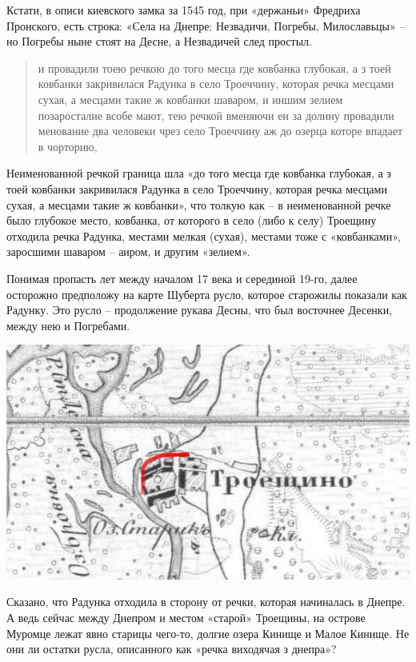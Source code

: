 Кстати, в описи киевского замка за 1545 год, при «держаньи» Фредриха Пронского, есть строка: «Села на Днепре: Незвадичи, Погребы, Милославьцы» – но Погребы ныне стоят на Десне, а Незвадичей след простыл.

\begin{quotation}
и провадили тоею речкою до того месца где ковбанка глубокая, а з тоей ковбанки закривилася Радунка в село Троеччину, которая речка месцами сухая, а месцами такие ж ковбанки шаваром, и иншим зелием позаросталие всобе мают, тею речкой вменяючи еи за долину провадили менование два человеки чрез село Троеччину аж до озерца которе впадает в чорторию, 
\end{quotation}

Неименованной речкой граница шла «до того месца где ковбанка глубокая, а з тоей ковбанки закривилася Радунка в село Троеччину, которая речка месцами сухая, а месцами такие ж ковбанки», что толкую как – в неименованной речке было глубокое место, ковбанка, от которого в село (либо к селу) Троещину отходила речка Радунка, местами мелкая (сухая), местами тоже с «ковбанками», заросшими шаваром – аиром, и другим «зелием».

Понимая пропасть лет между началом 17 века и серединой 19-го, далее осторожно предположу на карте Шуберта русло, которое старожилы показали как Радунку. Это русло – продолжение рукава Десны, что был восточнее Десенки, между нею и Погребами.

\begin{center}
\includegraphics[width=\linewidth]{chast-gorodki/star-ist/radunka-kovbanka.jpg}
\end{center}

Сказано, что Радунка отходила в сторону от  речки, которая начиналась в Днепре. А ведь сейчас между Днепром и местом «старой» Троещины, на острове Муромце лежат явно старицы чего-то, долгие озера Кинище и Малое Кинище. Не они ли остатки русла, описанного как «речка виходячая з днепра»?

